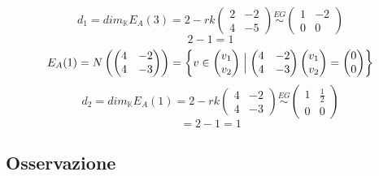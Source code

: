 \documentclass[12pt]{article}
\begin{document}
\[d_1 = dim_{\mathbb{K}}E_A(3) = 2 - rk\begin{pmatrix}
    2 & -2\\
    4 & -5
\end{pmatrix} \stackrel{EG}{\sim}\begin{pmatrix}
    1 & -2\\
    0 & 0
\end{pmatrix}\]
\[2 - 1 = 1\]
\[E_A(1) = N\left(\begin{pmatrix}
    4 & -2\\
    4 & -3
\end{pmatrix}\right) = \left\{v \in \begin{pmatrix}
    v_1\\
    v_2
\end{pmatrix} \Bigm\vert \begin{pmatrix}
    4 & -2\\
    4 & -3
\end{pmatrix} \begin{pmatrix}
    v_1\\
    v_2
\end{pmatrix} = \begin{pmatrix}
    0\\
    0
\end{pmatrix}\right\}\]
\[d_2 = dim_{\mathbb{K}}E_A(1) = 2 - rk\begin{pmatrix}
    4 & -2\\
    4 & -3
\end{pmatrix} \stackrel{EG}{\sim}\begin{pmatrix}
    1 & \frac{1}{2}\\
    0 & 0
\end{pmatrix}\]
\[= 2 - 1 = 1\]

\subsection{Osservazione}
\end{document}
